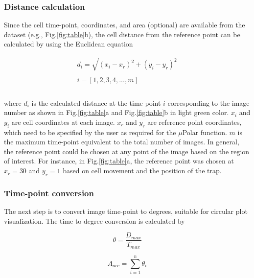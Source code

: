 \documentclass[conference]{IEEEtran}
\begin{document}
\subsubsection{Distance calculation}
Since the cell time-point, coordinates, and area (optional) are available from the dataset (e.g., Fig.\ref{fig:table}b), the cell distance from the reference point  can be calculated by using the Euclidean equation

\begin{equation}
\begin{split}
d_i = \sqrt{(x_i - x_r)^2 + (y_i - y_r)^2}\\
\\
i =  [1,2,3,4,..., m ] \\
\\
\end{split}
\end{equation}

\noindent where $ d_i $ is the calculated distance at the time-point $ i $ corresponding to the image number as shown in Fig.\ref{fig:table}a and Fig.\ref{fig:table}b in light green color. $ x_i $ and $ y_i $ are cell coordinates at each image. $ x_r $ and $ y_r $ are reference point coordinates, which need to be specified by the user as required for the $\mu$Polar function. $ m $ is the maximum time-point equivalent to the total number of images. In general, the reference point could be chosen at any point of the image based on the region of interest. For instance, in Fig.\ref{fig:table}a, the reference point was chosen at $x_r = 30$ and $y_r = 1$ based on cell movement and the position of the trap. 
\\

\subsubsection{Time-point conversion}
The next step is to convert  image time-point  to degrees, suitable for circular plot visualization. The time to degree conversion is calculated by

\begin{equation}
\theta = \frac{D_{max}} {T_{max}}
\end{equation}

\begin{equation}
A_{acc} = \sum_{i=1}^{n}{\theta_i}
\end{equation}
\end{document}
